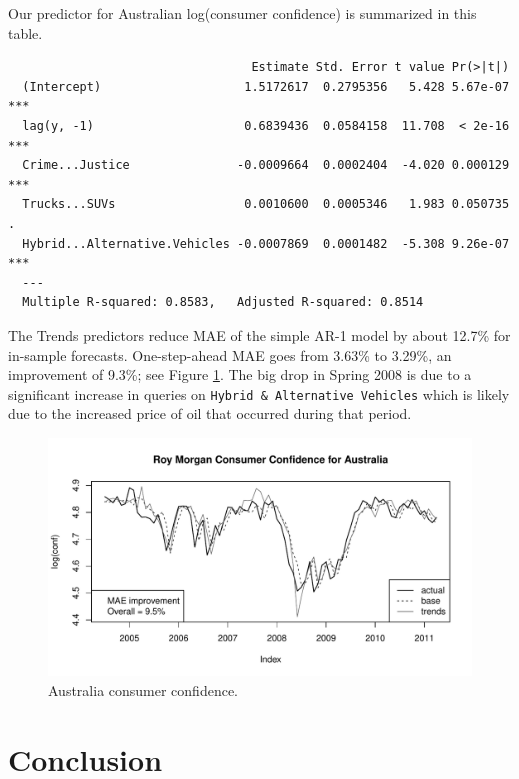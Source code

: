 \documentclass[12pt, oneside]{article}
\begin{document}
Our predictor for Australian log(consumer confidence) is summarized in
this table.

\small
\begin{verbatim}
                                  Estimate Std. Error t value Pr(>|t|)    
  (Intercept)                    1.5172617  0.2795356   5.428 5.67e-07 ***
  lag(y, -1)                     0.6839436  0.0584158  11.708  < 2e-16 ***
  Crime...Justice               -0.0009664  0.0002404  -4.020 0.000129 ***
  Trucks...SUVs                  0.0010600  0.0005346   1.983 0.050735 .  
  Hybrid...Alternative.Vehicles -0.0007869  0.0001482  -5.308 9.26e-07 ***
  ---
  Multiple R-squared: 0.8583,	Adjusted R-squared: 0.8514 
\end{verbatim}
\normalsize

The Trends predictors reduce MAE of the simple AR-1 model by about
12.7\% for in-sample forecasts.  One-step-ahead MAE goes from 3.63\%
to 3.29\%, an improvement of 9.3\%; see Figure \ref{Fig:conf}.  The
big drop in Spring 2008 is due to a significant increase in queries on
{\tt Hybrid \& Alternative Vehicles} which is likely due to the
increased price of oil that occurred during that period.

\begin{figure}[ht]
\begin{center}
\includegraphics[width= 5.5in]{conf}
\caption{\label{Fig:conf} Australia consumer confidence.} 
\end{center}
\end{figure}

\section{Conclusion \label{Sec:Conclusion}}  
\end{document}
